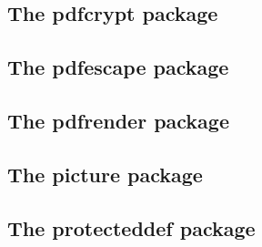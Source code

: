 \documentclass[a4paper,12pt]{article}
\makeatletter
\providecommand*{\pdfTeX}{pdf\TeX}
\providecommand*{\VTeX}{V\TeX}
\providecommand*{\eTeX}{$\csname m@th\endcsname\varepsilon$-\TeX}
\newcommand*{\xpackage}[1]{\textsf{#1}}
\newcommand*{\cs}[1]{\texttt{\textbackslash#1}}
\newcommand*{\tocinclude}[1]{%
  \setcounter{tocdepth}{3}%
  \begingroup
    \makeatletter
    \def\@prj{#1}%
    \let\contentsline\foreign@contentsline
  \endgroup
}
\def\foreign@contentsline#1#2#3#4{%
  \ifx\\#4\\%
    \csname l@#1\endcsname{#2}{#3}%
  \else
    \ifHy@linktocpage
      \csname l@#1\endcsname{{#2}}{%
        \hyper@linkfile{#3}{\@prj.pdf}{#4}%
      }%
    \else
      \csname l@#1\endcsname{%
        \hyper@linkfile{#2}{\@prj.pdf}{#4}%
      }{#3}%
    \fi
  \fi
}%
\newcommand*{\pkgsectformat}[1]{%
  \texorpdfstring{%
    \textcolor{link}{The} %
    \xpackage{#1} %
    \textcolor{link}{package}%
  }{#1}%
}
\makeatother
\begin{document}
\newpage
\subsection{\pkgsectformat{pdfcrypt}}
\label{pdfcrypt}
\begin{abstract}
This package supports the setting of pdf encryption options
for \VTeX\ and some older versions of \pdfTeX.
\end{abstract}
\tocinclude{pdfcrypt}

\newpage
\subsection{\pkgsectformat{pdfescape}}
\label{pdfescape}
\begin{abstract}
This package implements \pdfTeX's escape features
(\cs{pdfescapehex}, \cs{pdfunescapehex}, \cs{pdfescapename},
\cs{pdfescapestring}) using \TeX\ or \eTeX.
\end{abstract}
\tocinclude{pdfescape}

\newpage
\subsection{\pkgsectformat{pdfrender}}
\label{pdfrender}
\begin{abstract}
The PDF format has some graphics parameter like
line width or text rendering mode. This package
provides an interface for setting these parameters.
\end{abstract}
\tocinclude{pdfrender}


\newpage
\subsection{\pkgsectformat{picture}}
\label{picture}
\begin{abstract}
There are macro and environment arguments that expect numbers
that will internally be multiplicated with \cs{unitlength}.
This package extends the syntax of these arguments that
dimens with calculation support can be added for these arguments.
\end{abstract}
\tocinclude{picture}

\newpage
\subsection{\pkgsectformat{protecteddef}}
\label{protecteddef}
\begin{abstract}
This packages provides \cs{ProtectedDef} for defining
robust macros for both  and .
First 's \cs{protected} is tried, then
's \cs{DeclareRobustCommand} is used.
Otherwise the macro is not made robust.
\end{abstract}
\tocinclude{protecteddef}
\end{document}
